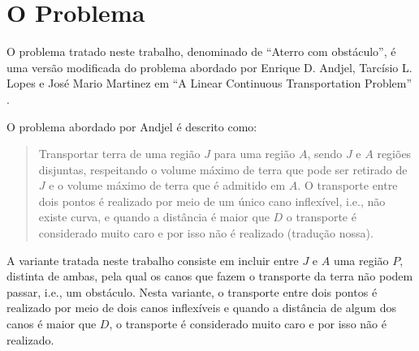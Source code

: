 %
%
%

\section{O Problema}
O problema tratado neste trabalho, denominado de ``Aterro com obstáculo'', é uma
versão modificada do problema abordado por Enrique D. Andjel, Tarcísio L. Lopes
e José Mario Martinez em ``A Linear Continuous Transportation Problem''
\cite{Andjel:1989:TP}.

O problema abordado por Andjel é descrito como:
\begin{quotation}
    Transportar terra de uma região $J$ para uma região $A$, sendo $J$ e $A$
    regiões disjuntas, respeitando o volume máximo de terra que pode ser
    retirado de $J$ e o volume máximo de terra que é admitido em $A$. O
    transporte entre dois pontos é realizado por meio de um único cano
    inflexível, i.e., não existe curva, e quando a distância é maior que $D$ o
    transporte é considerado muito caro e por isso não é realizado (tradução
    nossa).
\end{quotation}

A variante tratada neste trabalho consiste em incluir entre $J$ e $A$ uma 
região $P$, distinta de ambas, pela qual os canos que fazem o transporte da
terra não podem passar, i.e., um obstáculo. Nesta variante, o transporte entre
dois pontos é realizado por meio de dois canos inflexíveis e quando a distância
de algum dos canos é maior que $D$, o transporte é considerado muito caro e por
isso não é realizado.
